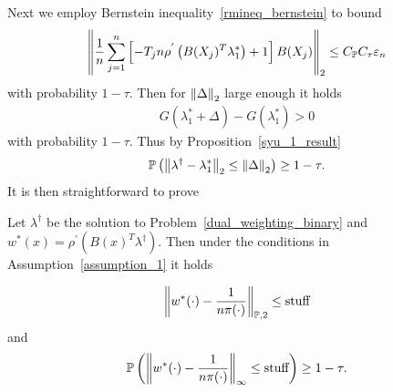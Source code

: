Next we employ Bernstein inequality~\ref{rmineq_bernstein} to bound
\begin{align}
    \left\lVert
      \frac{1}{n}
      \sum_{j = 1}^{n} 
      \left[ 
        -T_j n 
        \rho^{'} 
        \left( 
          B(X_j)^T \lambda^*_1
        \right)
      +
      1
      \right]
      B(X_j)
    \right\rVert_2
    \le
    C_{\mathbb{P}} C_\tau \varepsilon_n
\end{align}
with probability $1 - \tau$.
Then for 
$\left\lVert\Delta\right\rVert_2$ large enough it holds
\begin{gather}
  G(\lambda^*_1 + \Delta) 
  -
  G(\lambda^*_1)
  >
  0
\end{gather}
with probability $1 - \tau$.
Thus by Proposition~\ref{syu_1_result}
  \begin{gather}
    \mathbb{P}
    \left( 
      \left\lVert
        \lambda^\dagger
        -
        \lambda^*_1
      \right\rVert_2
      \le
      \left\lVert\Delta\right\rVert_2
    \right)
    \ge 
    1 - \tau
    .
  \end{gather}
It is then straightforward to prove

\begin{theorem}
  Let 
  $\lambda^\dagger$
  be the solution to Problem~\ref{dual_weighting_binary}
  and 
  $w^*(x)=\rho^{'}\left( B(x)^T \lambda^\dagger \right)$.
  Then under the conditions in Assumption~\ref{assumption_1}
  it holds

  \begin{align}
  \left\lVert
    w^*(\cdot)
    -
    \frac{1}{n \pi(\cdot)}
  \right\rVert_{\mathbb{P}, 2}
  \le 
  \text{stuff}
  \end{align}
and 
  \begin{align}
    \mathbb{P}
    \left( 
  \left\lVert
    w^*(\cdot)
    -
    \frac{1}{n \pi(\cdot)}
  \right\rVert_\infty
  \le 
  \text{stuff}
   \right)
   \ge
  1 - \tau
  .
  \end{align}
\end{theorem}
